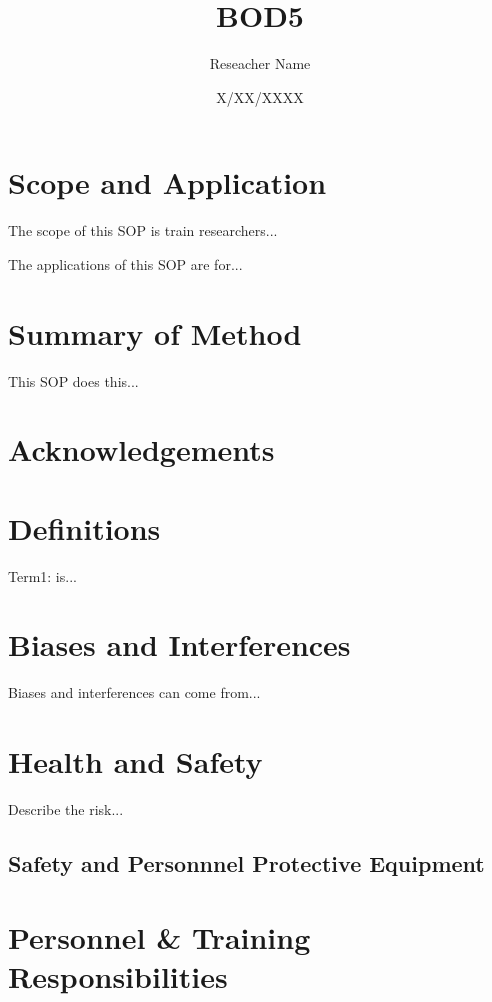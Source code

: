 \documentclass[12pt]{../SOP3_beta}
\title{BOD5}
\date{X/XX/XXXX}
\author{Reseacher Name}
\begin{document}


\maketitle

\section{Scope and Application}

\NP The scope of this SOP is train researchers...

\NP The applications of this SOP are for...

\section{Summary of Method}

\NP This SOP does this...

\tableofcontents

\newpage

\section{Acknowledgements}

\section{Definitions}

\NP Term1: is...

\section{Biases and Interferences}

\NP Biases and interferences can come from...

\section{Health and Safety}

\NP Describe the risk...


\subsection{Safety and Personnnel Protective Equipment}


\section{Personnel \& Training Responsibilities}
\end{document}
